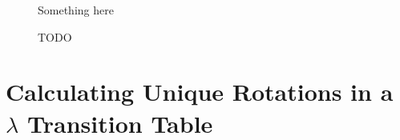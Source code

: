 \documentclass[a4paper,11pt]{report}
\begin{document}
\begin{appendices}
\begin{figure}
\begin{tabular}{cccc}

\end{tabular}
\caption[Rhomb Single Run Sequence]{
    Something here
}
\label{fig:crh_666_seq}

\end{figure}


\begin{figure}
\centering
\caption[Canonical Grid Data File]{
	TODO
}
\label{fig:gridfile}
\end{figure}

\section{Calculating Unique Rotations in a $\lambda$ Transition Table}
\label{appB:rot}

\processdelayedfloats
\end{appendices}



\end{document}
